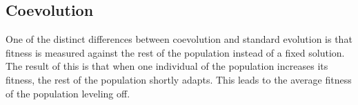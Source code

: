 \subsection{Coevolution}
	One of the distinct differences between coevolution and standard evolution is that fitness is measured against the rest of the population instead of a fixed solution. The result of this is that when one individual of the population increases its fitness, the rest of the population shortly adapts. This leads to the average fitness of the population leveling off.  